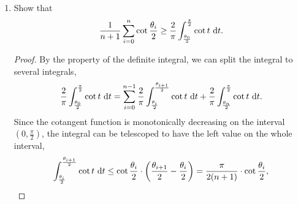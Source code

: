 \begin{enumerate}
\begin{enumerate}
\begin{proof}
\begin{align*}
			&=\frac{n+1}{\sqrt{1-x^2}}\cdot\sin[(n+1)\arccos x].
		\end{align*}
		Plug in \(x_k=\cos\theta_k\),
		\begin{align*}
			T'_{n+1}(x_k)&=\frac{n+1}{\sin\theta_k}\cdot\sin\left[(n+1)\cdot\frac{2k+1}{2(n+1)}\cdot\pi \right]\\
			&=\frac{n+1}{\sin\theta_k}\cdot\sin\left[(2k+1)\cdot\frac{\pi}{2}\right]\\
			&=(-1)^k\frac{n+1}{\sin\theta_k}.
		\end{align*}
		\end{proof}
		\item Conclude that
		\[ \sum_{i=0}^n|L_i(1)|\geq\frac{1}{n+1}\sum_{i=0}^n\cot \frac{\theta_i}{2}. \]
		\begin{proof}
		We apply the substitution from the result of previous questions.
		\begin{align*}
		L_i(1)&=\frac{T_{n+1}(1)}{(1-x_i)T'_{n+1}(x_i)}\\
		&=\frac{1}{(1-\cos\theta_i)\cdot(-1)^i\frac{n+1}{\sin\theta_i}}\\
		&=\frac{(-1)^{-i}}{n+1}\cdot\frac{\sin\theta_i}{1-\cos\theta_i}	=\frac{(-1)^{-i}}{n+1}\cdot\cot\frac{\theta_i}{2}.
		\end{align*}
		So the sum of their absolute values has
		\[ \sum_{i=0}^n|L_i(1)|=\sum_{i=0}^n\left|\frac{(-1)^{-i}}{n+1}\cot\frac{\theta_i}{2}\right|=\frac{1}{n+1}\sum_{i=0}^{n}\left|\cot\frac{\theta_i}{2} \right|\geq\frac{1}{n+1}\sum_{i=0}^{n}\cot\frac{\theta_i}{2}. \]
		\end{proof}
	\end{enumerate}	
	\item Show that
	\[ \frac{1}{n+1}\sum_{i=0}^n\cot \frac{\theta_i}{2}\geq\frac{2}{\pi}\int_{\frac{\theta_0}{2}}^{\frac{\pi}{2}}\cot t ~\mathrm{d} t. \]
	\begin{proof}
	By the property of the definite integral, we can split the integral to several integrals,
	\[ \frac{2}{\pi}\int_{\frac{\theta_0}{2}}^\frac{\pi}{2}\cot t~\mathrm{d} t=\sum_{i=0}^{n-1}\frac{2}{\pi}\int_{\frac{\theta_i}{2}}^\frac{\theta_{i+1}}{2}\cot t~\mathrm{d} t+\frac{2}{\pi}\int_{\frac{\theta_n}{2}}^\frac{\pi}{2}\cot t~\mathrm{d} t. \]
	Since the cotangent function is monotonically decreasing on the interval \(\left(0,\frac{\pi}{2}\right)\), the integral can be telescoped to have the left value on the whole interval,
	\[ \int_{\frac{\theta_i}{2}}^\frac{\theta_{i+1}}{2}\cot t~\mathrm{d} t\leq\cot\frac{\theta_i}{2}\cdot\left(\frac{\theta_{i+1}}{2}-\frac{\theta_{i}}{2}\right)=\frac{\pi}{2(n+1)}\cdot\cot\frac{\theta_i}{2}, \]

\end{proof}
\end{enumerate}
